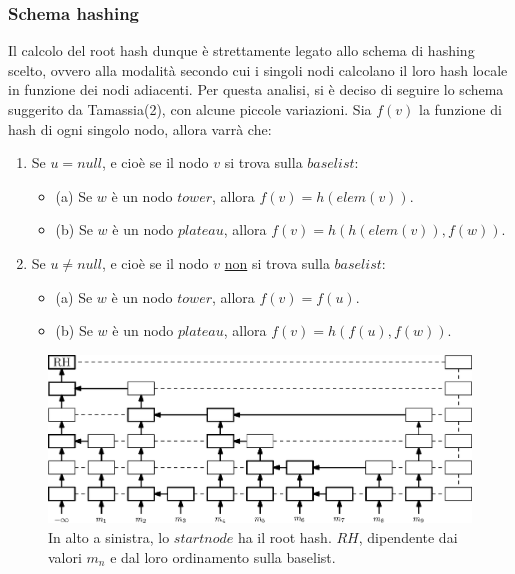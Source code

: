 		\subsubsection{Schema hashing}
	
	
		Il calcolo del root hash dunque è strettamente legato allo schema di hashing scelto, ovvero alla modalità secondo cui i singoli nodi calcolano il loro hash locale in funzione dei nodi adiacenti. Per questa analisi, si è deciso di seguire lo schema suggerito da Tamassia(2), con alcune piccole variazioni. 
		Sia $ f(v) $ la funzione di hash di ogni singolo nodo, allora varrà che:
		
		\begin{enumerate}
			\item Se $ u = null $, e cioè se il nodo $ v $ si trova sulla $ base list $:
				\begin{itemize}
					\item (a) Se $ w $ è un nodo $ tower $, allora $ f(v) = h(elem(v)) $.
					\item (b) Se $ w $ è un nodo $ plateau $, allora  $ f(v) = h(h(elem(v)), f(w)) $.
				\end{itemize}
			\item Se $ u \ne null $, e cioè se il nodo $ v $ \underline{non} si trova sulla $ base list $:
				\begin{itemize}
					\item (a) Se $ w $ è un nodo $ tower $, allora $ f(v) = f(u) $. 
					\item (b) Se $ w $ è un nodo $ plateau $, allora  $ f(v) = h(f(u), f(w)) $. 
				\end{itemize}
		\end{enumerate}
	
		\begin{figure}
			\centering
			\includegraphics[scale=0.6]{figure/hashFlow.eps}
			\caption{In alto a sinistra, lo $ start node $ ha il root hash. $ RH $, dipendente dai valori $ m_{n} $ e dal loro ordinamento sulla baselist.}\label{fig:6}
		\end{figure}
	
